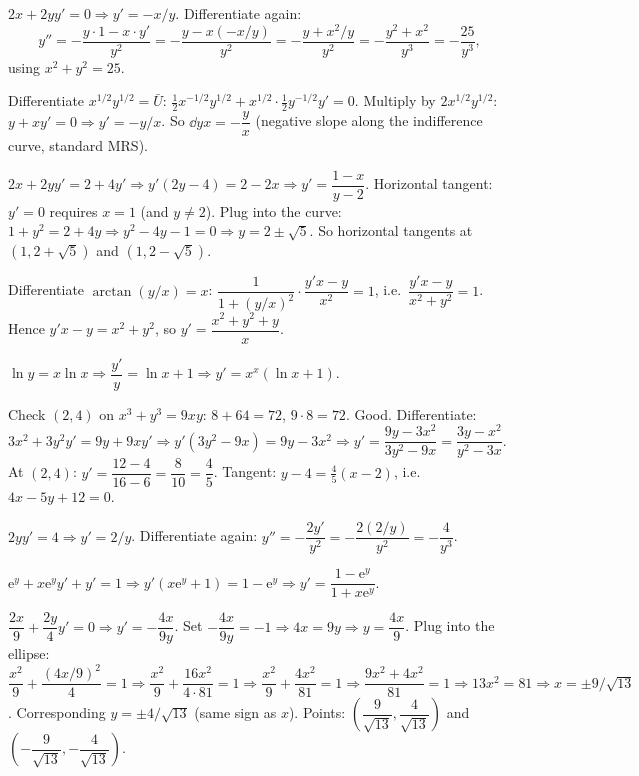 \begin{solutions}
  \item $2x+2yy'=0\Rightarrow y'=-x/y$. Differentiate again:
        \[
          y''=-\frac{y\cdot 1-x\cdot y'}{y^{2}}
             =-\frac{y-x(-x/y)}{y^{2}}
             =-\frac{y+x^{2}/y}{y^{2}}
             =-\frac{y^{2}+x^{2}}{y^{3}}=-\frac{25}{y^{3}},
        \]
        using $x^{2}+y^{2}=25$.

  \item Differentiate $x^{1/2}y^{1/2}=\bar U$:
        $\tfrac12x^{-1/2}y^{1/2}+x^{1/2}\cdot\tfrac12y^{-1/2}y'=0$.
        Multiply by $2x^{1/2}y^{1/2}$: $y+xy'=0\Rightarrow y'=-y/x$. So
        $\dd{y}{x}=-\dfrac{y}{x}$ (negative slope along the indifference
        curve, standard MRS).

  \item $2x+2yy'=2+4y'\Rightarrow y'(2y-4)=2-2x\Rightarrow
        y'=\dfrac{1-x}{y-2}$. Horizontal tangent: $y'=0$ requires $x=1$
        (and $y\neq 2$). Plug into the curve: $1+y^{2}=2+4y\Rightarrow
        y^{2}-4y-1=0\Rightarrow y=2\pm\sqrt{5}$. So horizontal tangents at
        $(1,2+\sqrt{5})$ and $(1,2-\sqrt{5})$.

  \item Differentiate $\arctan(y/x)=x$:
        $\dfrac{1}{1+(y/x)^{2}}\cdot\dfrac{y'x-y}{x^{2}}=1$, i.e.\
        $\dfrac{y'x-y}{x^{2}+y^{2}}=1$. Hence $y'x-y=x^{2}+y^{2}$, so
        $y'=\dfrac{x^{2}+y^{2}+y}{x}$.

  \item $\ln y=x\ln x\Rightarrow\dfrac{y'}{y}=\ln x+1\Rightarrow
        y'=x^{x}(\ln x+1)$.

  \item Check $(2,4)$ on $x^{3}+y^{3}=9xy$: $8+64=72$, $9\cdot 8=72$.
        Good. Differentiate: $3x^{2}+3y^{2}y'=9y+9xy'\Rightarrow
        y'(3y^{2}-9x)=9y-3x^{2}\Rightarrow
        y'=\dfrac{9y-3x^{2}}{3y^{2}-9x}=\dfrac{3y-x^{2}}{y^{2}-3x}$.
        At $(2,4)$: $y'=\dfrac{12-4}{16-6}=\dfrac{8}{10}=\dfrac{4}{5}$.
        Tangent: $y-4=\tfrac45(x-2)$, i.e.\ $4x-5y+12=0$.

  \item $2yy'=4\Rightarrow y'=2/y$. Differentiate again:
        $y''=-\dfrac{2y'}{y^{2}}=-\dfrac{2(2/y)}{y^{2}}=-\dfrac{4}{y^{3}}$.

  \item $\mathrm{e}^{y}+x\mathrm{e}^{y}y'+y'=1\Rightarrow
        y'(x\mathrm{e}^{y}+1)=1-\mathrm{e}^{y}\Rightarrow
        y'=\dfrac{1-\mathrm{e}^{y}}{1+x\mathrm{e}^{y}}$.

  \item $\dfrac{2x}{9}+\dfrac{2y}{4}y'=0\Rightarrow y'=-\dfrac{4x}{9y}$.
        Set $-\dfrac{4x}{9y}=-1\Rightarrow 4x=9y\Rightarrow y=\dfrac{4x}{9}$.
        Plug into the ellipse: $\dfrac{x^{2}}{9}+\dfrac{(4x/9)^{2}}{4}=1
        \Rightarrow\dfrac{x^{2}}{9}+\dfrac{16x^{2}}{4\cdot 81}=1
        \Rightarrow\dfrac{x^{2}}{9}+\dfrac{4x^{2}}{81}=1
        \Rightarrow\dfrac{9x^{2}+4x^{2}}{81}=1\Rightarrow
        13x^{2}=81\Rightarrow x=\pm 9/\sqrt{13}$. Corresponding
        $y=\pm 4/\sqrt{13}$ (same sign as $x$). Points:
        $\left(\dfrac{9}{\sqrt{13}},\dfrac{4}{\sqrt{13}}\right)$ and
        $\left(-\dfrac{9}{\sqrt{13}},-\dfrac{4}{\sqrt{13}}\right)$.


\end{solutions}
